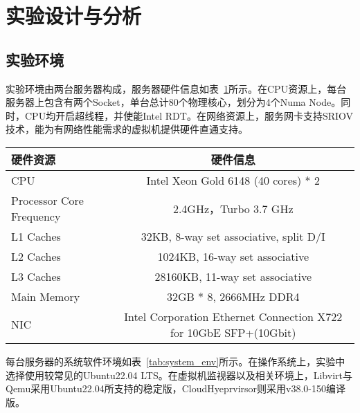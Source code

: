 \section{实验设计与分析}

\subsection{实验环境}

实验环境由两台服务器构成，服务器硬件信息如表~\ref{tab:exp_env}所示。在CPU资源上，每台服务器上包含有两个Socket，单台总计80个物理核心，划分为4个Numa Node。同时，CPU均开启超线程，并使能Intel RDT。在网络资源上，服务网卡支持SRIOV技术，能为有网络性能需求的虚拟机提供硬件直通支持。

\begin{table}[H]
    \label{tab:exp_env}
    \footnotesize%
    \setlength{\tabcolsep}{4pt}%
    \renewcommand{\arraystretch}{1.25}%
    \centering
    \begin{tabular}{lc}
        \hline
        硬件资源 & 硬件信息 \\
        \hline
        CPU & Intel Xeon Gold 6148 (40 cores) * 2 \\
        Processor Core Frequency & 2.4GHz，Turbo 3.7 GHz \\
        L1 Caches & 32KB,  8-way set associative, split D/I \\
        L2 Caches & 1024KB, 16-way set associative \\
        L3 Caches & 28160KB, 11-way set associative \\
        Main Memory & 32GB * 8, 2666MHz DDR4 \\
        NIC & Intel Corporation Ethernet Connection X722 for 10GbE SFP+(10Gbit) \\
        \hline
    \end{tabular}
\end{table}

每台服务器的系统软件环境如表~\ref{tab:system_env}所示。在操作系统上，实验中选择使用较常见的Ubuntu22.04 LTS。在虚拟机监视器以及相关环境上，Libvirt与Qemu采用Ubuntu22.04所支持的稳定版，CloudHyeprvirsor则采用v38.0-150编译版。

